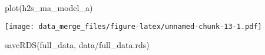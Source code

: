 \documentclass[
]{article}
\newenvironment{Shaded}{\begin{snugshade}}{\end{snugshade}}
\newcommand{\FunctionTok}[1]{\textcolor[rgb]{0.00,0.00,0.00}{#1}}
\newcommand{\NormalTok}[1]{#1}
\newcommand{\StringTok}[1]{\textcolor[rgb]{0.31,0.60,0.02}{#1}}
\begin{document}
\begin{Shaded}
\begin{Highlighting}[]
\FunctionTok{plot}\NormalTok{(h2s\_ma\_model\_a)}
\end{Highlighting}
\end{Shaded}

\texttt{[image: data\_merge\_files/figure-latex/unnamed-chunk-13-1.pdf]}

\begin{Shaded}
\begin{Highlighting}[]
\FunctionTok{saveRDS}\NormalTok{(full\_data, }\StringTok{\textquotesingle{}data/full\_data.rds\textquotesingle{}}\NormalTok{)}
\end{Highlighting}
\end{Shaded}
\end{document}
